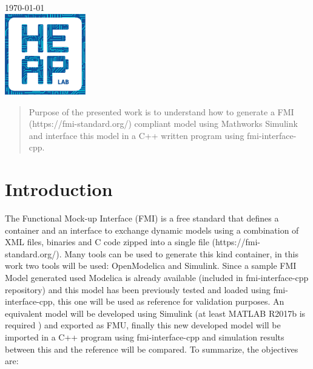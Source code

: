 \begin{titlepage}

{\large \today}\\[2cm] %


\includegraphics[width=100pt]{heaplogo.pdf}\\[1cm] %
 

\vfill %

\end{titlepage}




\begin{abstract}
Purpose of the presented work is to understand how to generate a FMI (https://fmi-standard.org/) compliant model using Mathworks Simulink and interface this model in a C++ written program using fmi-interface-cpp.
\end{abstract}

\section{Introduction}

The Functional Mock-up Interface (FMI) is a free standard that defines a container and an interface to exchange dynamic models using a combination of XML files, binaries and C code zipped into a single file (https://fmi-standard.org/).
\newline
Many tools can be used to generate this kind container, in this work two tools will be used: OpenModelica and Simulink. 
\newline
Since a sample FMI Model generated used Modelica is already available (included in fmi-interface-cpp repository) and this model has been previously tested and loaded using fmi-interface-cpp, this one will be used as reference for validation purposes. An equivalent model will be developed using Simulink (at least MATLAB R2017b is required ) and exported as FMU, finally this new developed model will be imported in a C++ program using  fmi-interface-cpp and simulation results between this and the reference will be compared. 
\newline
To summarize, the objectives are:

